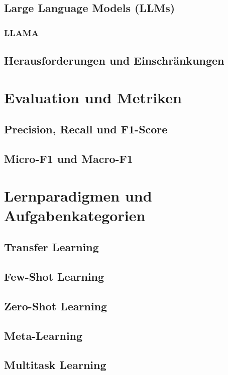 \subsection{Large Language Models (LLMs)}
\label{subsec:llms}

\subsubsection{LLAMA}
\label{subsubsec:LLAMA}

\subsection{Herausforderungen und Einschränkungen}
\label{subsec:llm-challenges}

\section{Evaluation und Metriken}
\label{sec:evaluation-metrics}

\subsection{Precision, Recall und F1-Score}
\label{subsec:precision-recall-f1}

\subsection{Micro-F1 und Macro-F1}
\label{subsec:micro-macro-f1}

\section{Lernparadigmen und Aufgabenkategorien}
\label{sec:lernparadigmen-aufgabenkategorien}

\subsection{Transfer Learning}
\label{subsec:transfer-learning}

\subsection{Few-Shot Learning}
\label{subsec:few-shot-learning}

\subsection{Zero-Shot Learning}
\label{subsec:zero-shot-learning}

\subsection{Meta-Learning}
\label{subsec:meta-learning}

\subsection{Multitask Learning}
\label{subsec:multitask-learning}

